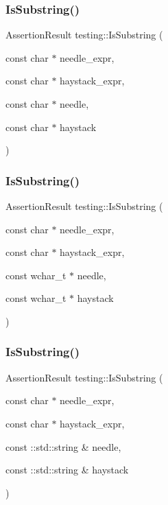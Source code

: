 \subsubsection{\texorpdfstring{IsSubstring()}{IsSubstring()}\hspace{0.1cm}{\footnotesize\ttfamily [1/3]}}
{\footnotesize\ttfamily Assertion\+Result testing\+::\+Is\+Substring (\begin{DoxyParamCaption}\item[{const char $\ast$}]{needle\+\_\+expr,  }\item[{const char $\ast$}]{haystack\+\_\+expr,  }\item[{const char $\ast$}]{needle,  }\item[{const char $\ast$}]{haystack }\end{DoxyParamCaption})}

\mbox{\label{namespacetesting_aa1c82529c7591d2a9fd016de45dd9113}} 
\subsubsection{\texorpdfstring{IsSubstring()}{IsSubstring()}\hspace{0.1cm}{\footnotesize\ttfamily [2/3]}}
{\footnotesize\ttfamily Assertion\+Result testing\+::\+Is\+Substring (\begin{DoxyParamCaption}\item[{const char $\ast$}]{needle\+\_\+expr,  }\item[{const char $\ast$}]{haystack\+\_\+expr,  }\item[{const wchar\+\_\+t $\ast$}]{needle,  }\item[{const wchar\+\_\+t $\ast$}]{haystack }\end{DoxyParamCaption})}

\mbox{\label{namespacetesting_a571c7edcfc574269833ebe3e7d338ec5}} 
\subsubsection{\texorpdfstring{IsSubstring()}{IsSubstring()}\hspace{0.1cm}{\footnotesize\ttfamily [3/3]}}
{\footnotesize\ttfamily Assertion\+Result testing\+::\+Is\+Substring (\begin{DoxyParamCaption}\item[{const char $\ast$}]{needle\+\_\+expr,  }\item[{const char $\ast$}]{haystack\+\_\+expr,  }\item[{const \+::std\+::string \&}]{needle,  }\item[{const \+::std\+::string \&}]{haystack }\end{DoxyParamCaption})}

